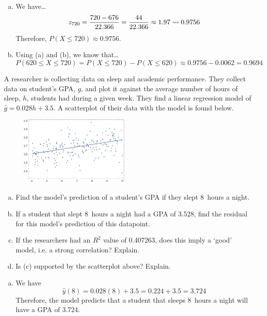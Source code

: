 \documentclass[12pt,letterpaper]{exam}
\begin{document}
\begin{questions}
\begin{enumerate}[(a)]
\item We have\dots
	\[
	z_{720}= \dfrac{720 - 676}{22.366}= \dfrac{44}{22.366} \approx 1.97 \rightsquigarrow 0.9756
	\]
Therefore, $P(X \leq 720) \approx 0.9756$. \pspace

\item Using (a) and (b), we know that\dots
	\[
	P(620 \leq X \leq 720)= P(X \leq 720) - P(X \leq 620) \approx 0.9756 - 0.0062= 0.9694
	\]
\end{enumerate}



\newpage
\question[10] A researcher is collecting data on sleep and academic performance. They collect data on student's GPA, $g$, and plot it against the average number of hours of sleep, $h$, students had during a given week. They find a linear regression model of $\widehat{g}= 0.028h + 3.5$. A scatterplot of their data with the model is found below.
	\begin{figure}[!ht]
	\centering
	\includegraphics[width=0.48\textwidth]{regplot.png}
	\end{figure}

\begin{enumerate}[(a)]
\item Find the model's prediction of a student's GPA if they slept 8~hours a night.
\item If a student that slept 8~hours a night had a GPA of 3.528, find the residual for this model's prediction of this datapoint. 
\item If the researchers had an $R^2$ value of 0.407263, does this imply a `good' model, i.e. a strong correlation? Explain.
\item Is (c) supported by the scatterplot above? Explain.
\end{enumerate} \pspace

\sol 
{\itshape
\begin{enumerate}[(a)]
\item We have
	\[
	\widehat{y}(8)= 0.028(8) + 3.5= 0.224 + 3.5= 3.724
	\] \pspace
Therefore, the model predicts that a student that sleeps 8~hours a night will have a GPA of 3.724. \pspace


\end{enumerate}}
\end{questions}
\end{document}
